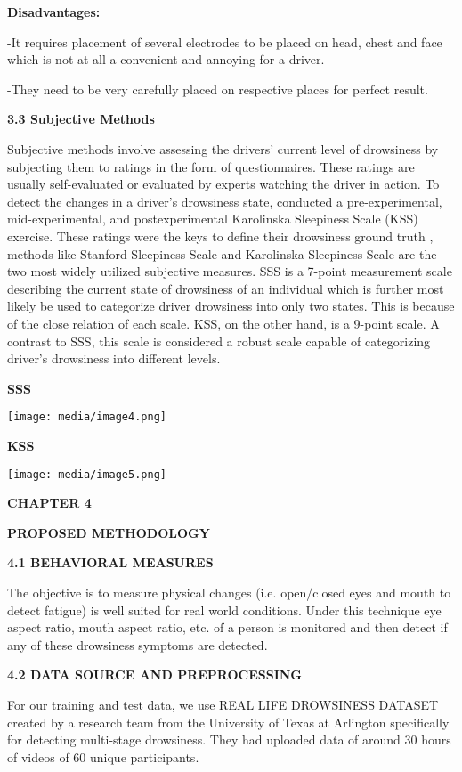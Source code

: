 \documentclass[a4paper,12pt]{article}
\begin{document}
\textbf{Disadvantages:}

-It requires placement of several electrodes to be placed on head, chest
and face which is not at all a convenient and annoying for a driver.

-They need to be very carefully placed on respective places for perfect
result.

\textbf{3.3 Subjective Methods}

Subjective methods involve assessing the drivers' current level of
drowsiness by subjecting them to ratings in the form of questionnaires.
These ratings are usually self-evaluated or evaluated by experts
watching the driver in action. To detect the changes in a driver's
drowsiness state, conducted a pre-experimental, mid-experimental, and
postexperimental Karolinska Sleepiness Scale (KSS) exercise. These
ratings were the keys to define their drowsiness ground truth , methods
like Stanford Sleepiness Scale and Karolinska Sleepiness Scale are the
two most widely utilized subjective measures. SSS is a 7-point
measurement scale describing the current state of drowsiness of an
individual which is further most likely be used to categorize driver
drowsiness into only two states. This is because of the close relation
of each scale. KSS, on the other hand, is a 9-point scale. A contrast to
SSS, this scale is considered a robust scale capable of categorizing
driver's drowsiness into different levels.

\textbf{SSS}

\texttt{[image: media/image4.png]}

\textbf{KSS}

\texttt{[image: media/image5.png]}

\textbf{CHAPTER 4}

\textbf{PROPOSED METHODOLOGY}

\textbf{4.1 BEHAVIORAL MEASURES}

The objective is to measure physical changes (i.e. open/closed eyes and
mouth to detect fatigue) is well suited for real world conditions. Under
this technique eye aspect ratio, mouth aspect ratio, etc. of a person is
monitored and then detect if any of these drowsiness symptoms are
detected.

\textbf{4.2 DATA SOURCE AND PREPROCESSING}

For our training and test data, we use REAL LIFE DROWSINESS DATASET
created by a research team from the University of Texas at Arlington
specifically for detecting multi-stage drowsiness. They had uploaded
data of around 30 hours of videos of 60 unique participants.
\end{document}
